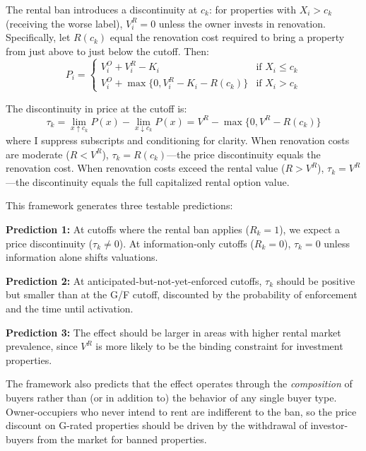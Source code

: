 \documentclass[12pt]{article}
\begin{document}
The rental ban introduces a discontinuity at $c_k$: for properties with $X_i > c_k$ (receiving the worse label), $V^R_i = 0$ unless the owner invests in renovation. Specifically, let $R(c_k)$ equal the renovation cost required to bring a property from just above to just below the cutoff. Then:
\begin{equation}
    P_i = \begin{cases}
        V^O_i + V^R_i - K_i & \text{if } X_i \leq c_k \\
        V^O_i + \max\{0, V^R_i - K_i - R(c_k)\} & \text{if } X_i > c_k
    \end{cases}
\end{equation}

The discontinuity in price at the cutoff is:
\begin{equation}
    \tau_k = \lim_{x \uparrow c_k} P(x) - \lim_{x \downarrow c_k} P(x) = V^R - \max\{0, V^R - R(c_k)\}
\end{equation}
where I suppress subscripts and conditioning for clarity. When renovation costs are moderate ($R < V^R$), $\tau_k = R(c_k)$---the price discontinuity equals the renovation cost. When renovation costs exceed the rental value ($R > V^R$), $\tau_k = V^R$---the discontinuity equals the full capitalized rental option value.

This framework generates three testable predictions:

\textbf{Prediction 1:} At cutoffs where the rental ban applies ($R_k = 1$), we expect a price discontinuity ($\tau_k \neq 0$). At information-only cutoffs ($R_k = 0$), $\tau_k = 0$ unless information alone shifts valuations.

\textbf{Prediction 2:} At anticipated-but-not-yet-enforced cutoffs, $\tau_k$ should be positive but smaller than at the G/F cutoff, discounted by the probability of enforcement and the time until activation.

\textbf{Prediction 3:} The effect should be larger in areas with higher rental market prevalence, since $V^R$ is more likely to be the binding constraint for investment properties.

The framework also predicts that the effect operates through the \textit{composition} of buyers rather than (or in addition to) the behavior of any single buyer type. Owner-occupiers who never intend to rent are indifferent to the ban, so the price discount on G-rated properties should be driven by the withdrawal of investor-buyers from the market for banned properties.
\end{document}
